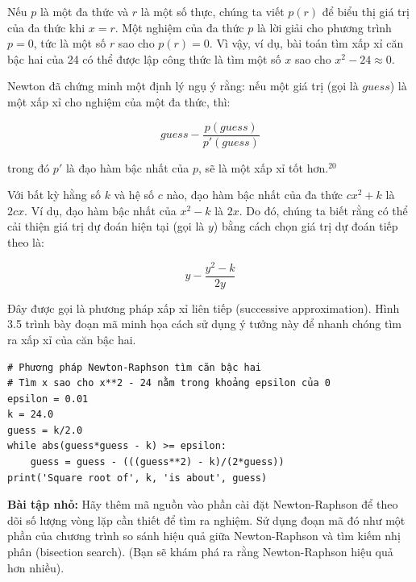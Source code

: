 Nếu $p$ là một đa thức và $r$ là một số thực, chúng ta viết $p(r)$ để biểu thị giá trị của đa thức khi $x = r$. Một nghiệm của đa thức $p$ là lời giải cho phương trình $p = 0$, tức là một số $r$ sao cho $p(r) = 0$. Vì vậy, ví dụ, bài toán tìm xấp xỉ căn bậc hai của 24 có thể được lập công thức là tìm một số $x$ sao cho $x^2 - 24 \approx 0$.

Newton đã chứng minh một định lý ngụ ý rằng: nếu một giá trị (gọi là $guess$) là một xấp xỉ cho nghiệm của một đa thức, thì:

$$
guess - \frac{p(guess)}{p'(guess)}
$$

trong đó $p'$ là đạo hàm bậc nhất của $p$, sẽ là một xấp xỉ tốt hơn.$^{20}$

Với bất kỳ hằng số $k$ và hệ số $c$ nào, đạo hàm bậc nhất của đa thức $cx^2 + k$ là $2cx$. Ví dụ, đạo hàm bậc nhất của $x^2 - k$ là $2x$. Do đó, chúng ta biết rằng có thể cải thiện giá trị dự đoán hiện tại (gọi là $y$) bằng cách chọn giá trị dự đoán tiếp theo là:

$$
y - \frac{y^2 - k}{2y}
$$

Đây được gọi là phương pháp xấp xỉ liên tiếp (successive approximation). Hình 3.5 trình bày đoạn mã minh họa cách sử dụng ý tưởng này để nhanh chóng tìm ra xấp xỉ của căn bậc hai.

\begin{tcolorbox}[title=Hình 3.5: Cài đặt phương pháp Newton-Raphson]

\begin{verbatim}
# Phương pháp Newton-Raphson tìm căn bậc hai
# Tìm x sao cho x**2 - 24 nằm trong khoảng epsilon của 0
epsilon = 0.01
k = 24.0
guess = k/2.0
while abs(guess*guess - k) >= epsilon:
    guess = guess - (((guess**2) - k)/(2*guess))
print('Square root of', k, 'is about', guess)
\end{verbatim}

\end{tcolorbox}

\noindent \textbf{Bài tập nhỏ:} Hãy thêm mã nguồn vào phần cài đặt Newton-Raphson để theo dõi số lượng vòng lặp cần thiết để tìm ra nghiệm. Sử dụng đoạn mã đó như một phần của chương trình so sánh hiệu quả giữa Newton-Raphson và tìm kiếm nhị phân (bisection search). (Bạn sẽ khám phá ra rằng Newton-Raphson hiệu quả hơn nhiều).


